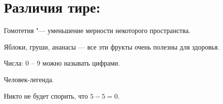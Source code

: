 \documentclass[a4paper, 12pt]{article}
\begin{document}
    \section*{Различия тире:}
    \indent %

    Гомотетия "--- уменьшение мерности некоторого пространства.
    
    Яблоки, груши, ананасы --- все эти фрукты очень полезны для здоровья.

    Числа: 0 -- 9 можно называть цифрами.

    Человек-легенда.

    Никто не будет спорить, что $5 - 5 = 0$.
\end{document}
